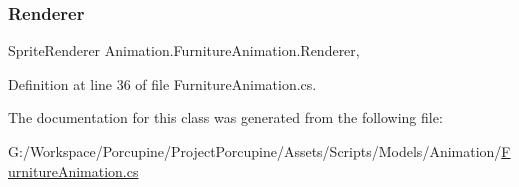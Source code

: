 \subsubsection{\texorpdfstring{Renderer}{Renderer}}
{\footnotesize\ttfamily Sprite\+Renderer Animation.\+Furniture\+Animation.\+Renderer\hspace{0.3cm}{\ttfamily [get]}, {\ttfamily [set]}}



Definition at line 36 of file Furniture\+Animation.\+cs.



The documentation for this class was generated from the following file\+:\begin{DoxyCompactItemize}
\item 
G\+:/\+Workspace/\+Porcupine/\+Project\+Porcupine/\+Assets/\+Scripts/\+Models/\+Animation/\hyperlink{_furniture_animation_8cs}{Furniture\+Animation.\+cs}\end{DoxyCompactItemize}
